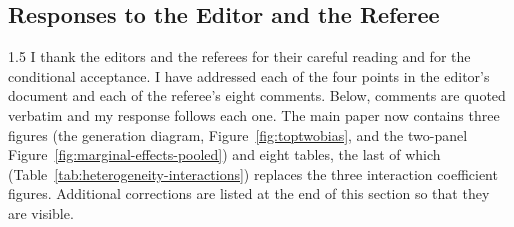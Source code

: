 \documentclass[12pt,english]{article}
\newcommand{\rrxspc}{1.5}
\begin{document}
\begin{refsection}
\setcounter{section}{0}
\renewcommand{\thesection}{\Alph{section}}
\renewcommand{\thesubsection}{\Alph{section}.\arabic{subsection}}
\renewcommand{\thesubsubsection}{\Alph{section}.\arabic{subsection}.\arabic{subsubsection}}

        \section{Responses to the Editor and the Referee} \label{rr:responses}
        \begin{spacing}{\rrxspc}
            I thank the editors and the referees for their careful reading and for the conditional acceptance. I have addressed each of the four points in the editor's document and each of the referee's eight comments. Below, comments are quoted verbatim and my response follows each one. The main paper now contains three figures (the generation diagram, Figure~\ref{fig:toptwobias}, and the two-panel Figure~\ref{fig:marginal-effects-pooled}) and eight tables, the last of which (Table~\ref{tab:heterogeneity-interactions}) replaces the three interaction coefficient figures. Additional corrections are listed at the end of this section so that they are visible.
        \end{spacing}

    \newpage


\end{refsection}
\end{document}
